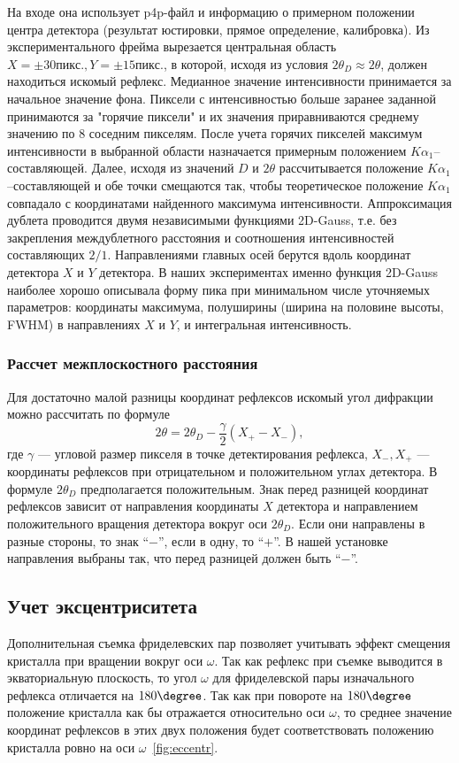 На входе она использует p4p-файл и информацию о примерном положении центра детектора (результат юстировки, прямое определение, калибровка).
Из экспериментального фрейма вырезается центральная область $X = \pm 30\unit{пикс.}, Y = \pm 15\unit{пикс.}$, в которой, исходя из условия $2\theta_D \approx 2\theta$, должен находиться искомый рефлекс.
Медианное значение интенсивности принимается за начальное значение фона.
Пиксели с интенсивностью больше заранее заданной принимаются за "горячие пиксели" и их значения приравниваются среднему значению по 8 соседним пикселям.
После учета горячих пикселей максимум интенсивности в выбранной области назначается примерным положением $K\alpha_1$--составляющей.
Далее, исходя из значений $D$ и $2\theta$ рассчитывается положение $K\alpha_1$--составляющей и обе точки смещаются так, чтобы теоретическое положение $K\alpha_1$ совпадало с координатами найденного максимума интенсивности.
Аппроксимация дублета проводится двумя независимыми  функциями 2D-Gauss, т.е. без закрепления междублетного расстояния и соотношения интенсивностей составляющих $2/1$.
Направлениями главных осей берутся вдоль координат детектора $X$ и $Y$ детектора.
В наших экспериментах именно функция 2D-Gauss наиболее хорошо описывала форму пика при минимальном числе уточняемых параметров: координаты максимума, полуширины (ширина на половине высоты, FWHM) в направлениях $X$ и $Y$, и интегральная интенсивность.
\subsubsection{Рассчет межплоскостного расстояния}
Для достаточно малой разницы координат рефлексов искомый угол дифракции можно рассчитать по формуле
\begin{equation} \label{eq:bond2}
    2\theta = 2\theta_D - \frac{\gamma}{2} (X_{+} - X_{-}),
\end{equation}
где $\gamma$ --- угловой размер пикселя в точке детектирования рефлекса, $X_{-}, X_{+}$ --- координаты рефлексов при отрицательном и положительном углах детектора.
В формуле $2\theta_D$ предполагается положительным.
Знак перед разницей координат рефлексов зависит от направления координаты $X$ детектора и направлением положительного вращения детектора вокруг оси $2\theta_D$.
Если они направлены в разные стороны, то знак ``$-$'', если в одну, то ``$+$''.
В нашей установке направления выбраны так, что перед разницей должен быть ``$-$''.
\subsection{Учет эксцентриситета}
Дополнительная съемка фриделевских пар позволяет учитывать эффект смещения кристалла при вращении вокруг оси $\omega$.
Так как рефлекс при съемке выводится в экваториальную плоскость, то угол $\omega$ для фриделевской пары изначального рефлекса отличается на $180\degree$.
Так как при повороте на $180\degree$ положение кристалла как бы отражается относительно оси $\omega$, то среднее значение координат рефлексов в этих двух положения будет соответствовать положению кристалла ровно на оси $\omega$~\ref{fig:eccentr}.

